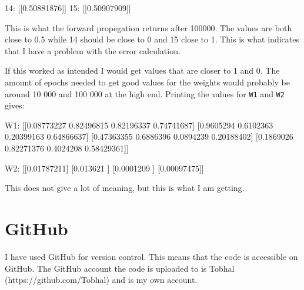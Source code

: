 \documentclass[10pt]{article}
\begin{document}
    \begin{pythoncode}
    14: [[0.50881876]]
    15: [[0.50907909]]
    \end{pythoncode}

    This is what the forward propegation returns after 100000. The values are both close to 0.5 while 14 should be close to 0 and 15 close to 1. This is what indicates that I have a problem with the error calculation.

    If this worked as intended I would get values that are closer to 1 and 0. The amount of epochs needed to get good values for the weights would probably be around 10 000 and 100 000 at the high end. Printing the values for \texttt{W1} and \texttt{W2} gives:

    \begin{pythoncode}
    W1:
    [[0.08773227 0.82496815 0.82196337 0.74741687]
     [0.9605294  0.6102363  0.20399163 0.64866637]
     [0.47363355 0.6886396  0.0894239  0.20188402]
     [0.1869026  0.82271376 0.4024208  0.58429361]]

    W2:
    [[0.01787211]
     [0.013621  ]
     [0.0001209 ]
     [0.00097475]]
    \end{pythoncode}

    This does not give a lot of meaning, but this is what I am getting.

    \section{GitHub}
    I have used GitHub for version control. This means that the code is accessible on GitHub. The GitHub account the code is uploaded to is Tobhal (https://github.com/Tobhal) and is my own account. 
\end{document}
